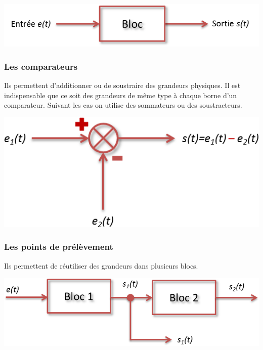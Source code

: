 \documentclass[11pt,oneside]{article}
\begin{document}
\begin{center}
    \includegraphics[width=.7\textwidth]{png/bloc}
\end{center}

\subsubsection*{Les comparateurs}
\begin{minipage}[c]{.55\linewidth}
Ils permettent d'additionner ou de soustraire des grandeurs physiques. Il est indispensable que ce soit des grandeurs de même type à chaque borne d'un comparateur. Suivant les cas on utilise des sommateurs ou des soustracteurs.
\end{minipage}\hfill
\begin{minipage}[c]{.4\linewidth}
\begin{center}
    \includegraphics[width=\textwidth]{png/comp}
\end{center}
\end{minipage}

\subsubsection*{Les points de prélèvement}

\begin{minipage}[c]{.55\linewidth}
Ils permettent de réutiliser des grandeurs dans plusieurs blocs.
\end{minipage}\hfill
\begin{minipage}[c]{.4\linewidth}
\begin{center}
    \includegraphics[width=\textwidth]{png/prel}
\end{center}
\end{minipage}
\end{document}
